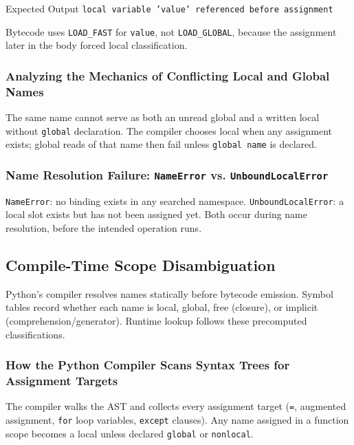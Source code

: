 \documentclass[a4paper,twoside]{report}
\begin{document}
\begin{iobox}{Expected Output}
\texttt{local variable 'value' referenced before assignment} \\
\end{iobox}




Bytecode uses \texttt{LOAD\_FAST} for \texttt{value}, not \texttt{LOAD\_GLOBAL}, because the assignment later in the body forced local classification.

\subsubsection{Analyzing the Mechanics of Conflicting Local and Global Names}

The same name cannot serve as both an unread global and a written local without \texttt{global} declaration. The compiler chooses local when any assignment exists; global reads of that name then fail unless \texttt{global name} is declared.

\subsubsection{Name Resolution Failure: \texttt{NameError} vs. \texttt{UnboundLocalError}}

\texttt{NameError}: no binding exists in any searched namespace. \texttt{UnboundLocalError}: a local slot exists but has not been assigned yet. Both occur during name resolution, before the intended operation runs.


\subsection{Compile-Time Scope Disambiguation}

Python's compiler resolves names statically before bytecode emission. Symbol tables record whether each name is local, global, free (closure), or implicit (comprehension/generator). Runtime lookup follows these precomputed classifications.

\subsubsection{How the Python Compiler Scans Syntax Trees for Assignment Targets}

The compiler walks the AST and collects every assignment target (\texttt{=}, augmented assignment, \texttt{for} loop variables, \texttt{except} clauses). Any name assigned in a function scope becomes a local unless declared \texttt{global} or \texttt{nonlocal}.
\end{document}
